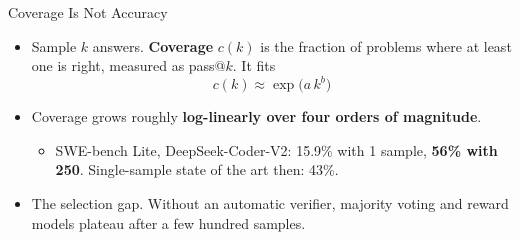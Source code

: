 \begin{frame}{Coverage Is Not Accuracy}
    \begin{itemize}\itemsep0.35em
        \item Sample $k$ answers. \textbf{Coverage} $c(k)$ is the fraction of problems where at least one is right, measured as pass@$k$. It fits
        \[
            c(k)\approx \exp\!\big(a\,k^{b}\big)
        \]
        \item Coverage grows roughly \textbf{log-linearly over four orders of magnitude}.
        \begin{itemize}\itemsep0.15em
            \item SWE-bench Lite, DeepSeek-Coder-V2: 15.9\% with 1 sample, \textbf{56\% with 250}. Single-sample state of the art then: 43\%.
        \end{itemize}
        \item \alert{The selection gap.} Without an automatic verifier, majority voting and reward models plateau after a few hundred samples.
    \end{itemize}
    \vspace{0.1em}
\end{frame}

